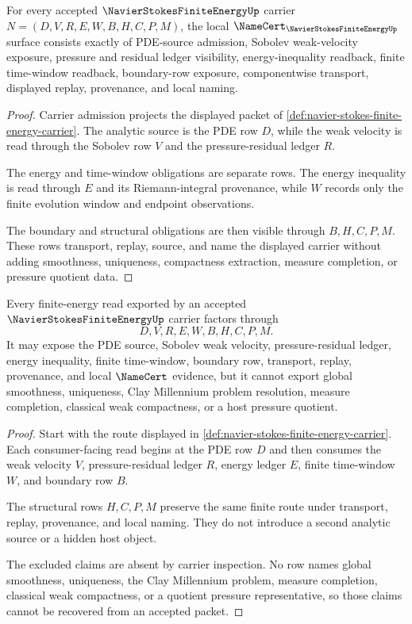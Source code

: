 \begin{theorem}
\label{thm:navier-stokes-finite-energy-obligations}
For every accepted $\NavierStokesFiniteEnergyUp$ carrier $N=(D,V,R,E,W,B,H,C,P,M)$, the local $\NameCert_{\NavierStokesFiniteEnergyUp}$ surface consists exactly of PDE-source admission, Sobolev weak-velocity exposure, pressure and residual ledger visibility, energy-inequality readback, finite time-window readback, boundary-row exposure, componentwise transport, displayed replay, provenance, and local naming.
\end{theorem}
\begin{proof}
Carrier admission projects the displayed packet of \autoref{def:navier-stokes-finite-energy-carrier}. The analytic source is the PDE row $D$, while the weak velocity is read through the Sobolev row $V$ and the pressure-residual ledger $R$.

The energy and time-window obligations are separate rows. The energy inequality is read through $E$ and its Riemann-integral provenance, while $W$ records only the finite evolution window and endpoint observations.

The boundary and structural obligations are then visible through $B,H,C,P,M$. These rows transport, replay, source, and name the displayed carrier without adding smoothness, uniqueness, compactness extraction, measure completion, or pressure quotient data.
\end{proof}

\begin{theorem}
\label{thm:navier-stokes-finite-energy-nonescape}
Every finite-energy read exported by an accepted $\NavierStokesFiniteEnergyUp$ carrier factors through
$$
D,V,R,E,W,B,H,C,P,M.
$$
It may expose the PDE source, Sobolev weak velocity, pressure-residual ledger, energy inequality, finite time-window, boundary row, transport, replay, provenance, and local $\NameCert$ evidence, but it cannot export global smoothness, uniqueness, Clay Millennium problem resolution, measure completion, classical weak compactness, or a host pressure quotient.
\end{theorem}
\begin{proof}
Start with the route displayed in \autoref{def:navier-stokes-finite-energy-carrier}. Each consumer-facing read begins at the PDE row $D$ and then consumes the weak velocity $V$, pressure-residual ledger $R$, energy ledger $E$, finite time-window $W$, and boundary row $B$.

The structural rows $H,C,P,M$ preserve the same finite route under transport, replay, provenance, and local naming. They do not introduce a second analytic source or a hidden host object.

The excluded claims are absent by carrier inspection. No row names global smoothness, uniqueness, the Clay Millennium problem, measure completion, classical weak compactness, or a quotient pressure representative, so those claims cannot be recovered from an accepted packet.
\end{proof}

